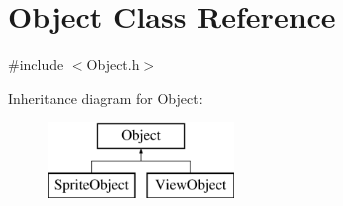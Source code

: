 \hypertarget{class_object}{\section{Object Class Reference}
\label{class_object}
}


{\ttfamily \#include $<$Object.\+h$>$}

Inheritance diagram for Object\+:\begin{figure}[H]
\begin{center}
\leavevmode
\includegraphics[height=2.000000cm]{class_object}
\end{center}
\end{figure}
